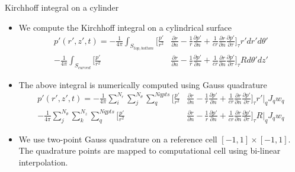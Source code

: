 \documentclass[10pt, aspectratio=169]{beamer}
\begin{document}
\begin{frame}{Kirchhoff integral on a cylinder}
	\begin{itemize}
		\item We compute the Kirchhoff integral on a cylindrical surface 
		\begin{equation}
			\begin{split}
				p'(r', z', t) =  -\frac{1}{4\pi}\int_{S_{top, bottom}}\Big[  \frac{p'}{r^{2}}&\frac{\partial r}{\partial n} - \frac{1}{r}\frac{\partial p'}{\partial n} + \frac{1}{c r}\frac{\partial r}{\partial n}\frac{\partial p'}{\partial \tau} \Big]_{\tau} r'dr'd\theta' \\
								 -\frac{1}{4\pi}\int_{S_{curved}} \Big[  \frac{p'}{r^{2}}&\frac{\partial r}{\partial n} - \frac{1}{r}\frac{\partial p'}{\partial n} + \frac{1}{c r}\frac{\partial r}{\partial n}\frac{\partial p'}{\partial \tau} \Big]_{\tau} Rd\theta'dz'  
			\end{split} 
		\end{equation}
		\item The above integral is numerically computed using Gauss quadrature
		\begin{equation}
			\begin{split}
				p'(r', z', t) =  -\frac{1}{4\pi}\sum_{i}^{N_r}\sum_{j}^{N_\theta}\sum_q^{Nqpts} \Big[  \frac{p'}{r^{2}}&\frac{\partial r}{\partial n} - \frac{1}{r}\frac{\partial p'}{\partial n} + \frac{1}{c r}\frac{\partial r}{\partial n}\frac{\partial p'}{\partial \tau} \Big]_{\tau} r'\Big |_q J_q w_q\\
								 -\frac{1}{4\pi}\sum_{j}^{N_\theta}\sum_{k}^{N_z}\sum_q^{Nqpts} \Big[  \frac{p'}{r^{2}}&\frac{\partial r}{\partial n} - \frac{1}{r}\frac{\partial p'}{\partial n} + \frac{1}{c r}\frac{\partial r}{\partial n}\frac{\partial p'}{\partial \tau} \Big]_{\tau} R \Big |_q J_q w_q 
			\end{split} 
		\end{equation}
		\item We use two-point Gauss quadrature on a reference cell $[-1, 1]\times [-1, 1]$. The quadrature points are mapped to computational cell using bi-linear interpolation. 
	\end{itemize}
\end{frame}
\end{document}
